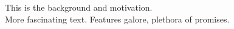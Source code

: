 This is the background and motivation. \\

More fascinating text. Features galore, plethora of promises.\\